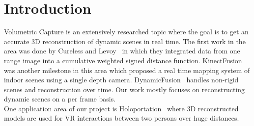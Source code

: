 \documentclass[10pt,twocolumn,letterpaper]{article}
\begin{document}
\section{Introduction}

Volumetric Capture is an extensively researched topic where the goal is to get an accurate 3D reconstruction of dynamic scenes in real time. The first work in the area was done by Cureless and Levoy~\cite{Authors4} in which they integrated data from one range image into a cumulative weighted signed distance function. KinectFusion~\cite{Authors5} was another milestone in this area which proposed a real time mapping system of indoor scenes using a single depth camera. DynamicFusion~\cite{Authors6} handles non-rigid scenes and reconstruction over time. Our work mostly focuses on reconstructing dynamic scenes on a per frame basis.\\
One application area of our project is Holoportation~\cite{Authors7} where 3D reconstructed models are used for VR interactions between two persons over huge distances.
\end{document}
